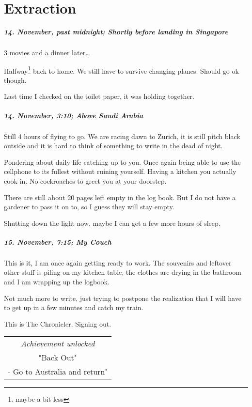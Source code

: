 \chapter{Extraction}


\paragraph{14. November, past midnight; Shortly before landing in Singapore}
3 movies and a dinner later\ldots{}

Halfway\footnote{maybe a bit less} back to home.
We still have to survive changing planes.
Should go ok though.

Last time I checked on the toilet paper, it was holding together.

\paragraph{14. November, 3:10; Above Saudi Arabia}
Still 4 hours of flying to go.
We are racing dawn to Zurich, it is still pitch black outside and it is hard to think of something to write in the dead of night.

Pondering about daily life catching up to you.
Once again being able to use the cellphone to its fullest without ruining yourself.
Having a kitchen you actually cook in.
No cockroaches to greet you at your doorstep.

There are still about 20 pages left empty in the log book.
But I do not have a gardener to pass it on to, so I guess they will stay empty.

Shutting down the light now, maybe I can get a few more hours of sleep.

\paragraph{15. November, 7:15; My Couch}
This is it, I am once again getting ready to work.
The souvenirs and leftover other stuff is piling on my kitchen table, the clothes are drying in the bathroom and I am wrapping up the logbook.

Not much more to write, just trying to postpone the realization that I will have to get up in a few minutes and catch my train.

This is The Chronicler.
Signing out.

\begin{center}
\begin{tabular}{||c||}
\emph{Achievement unlocked}\\
"Back Out"\\
\multicolumn{1}{||p{0.8\textwidth}||}{\footnotesize - Go to Australia and return"} \\
\end{tabular}
\end{center}

